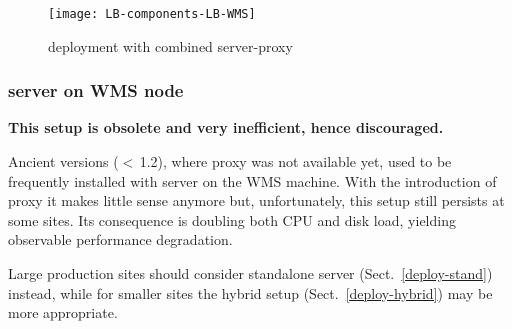 \begin{figure}[ht]
\centering
\texttt{[image: LB-components-LB-WMS]}
\caption{\LB deployment with combined server-proxy}
\label{f:comp-hybrid}
\end{figure}


\subsubsection{\LB server on WMS node}

\textbf{This setup is obsolete and very inefficient, hence discouraged.}

Ancient \LB versions ($<$\,1.2), where \LB proxy was not available yet,
used to be frequently installed with \LB server on the WMS machine.
With the introduction of \LB proxy it makes little sense anymore
but, unfortunately, this setup still persists at some sites.
Its consequence is doubling both CPU and disk load, yielding observable
performance degradation.

Large production sites should consider standalone \LB server (Sect.~\ref{deploy-stand})
instead, while for smaller sites the hybrid setup (Sect.~\ref{deploy-hybrid}) may
be more appropriate.
